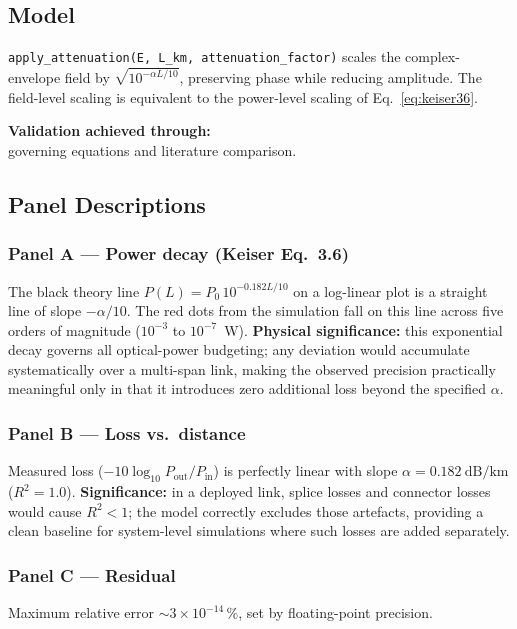 ﻿\documentclass[11pt,a4paper]{article}
\newcommand{\code}[1]{\texttt{#1}}
\begin{document}
\subsection{Model}
\code{apply\_attenuation(E, L\_km, attenuation\_factor)} scales the
complex-envelope field by $\sqrt{10^{-\alpha L/10}}$, preserving phase while
reducing amplitude.  The field-level scaling is equivalent to the
power-level scaling of Eq.~\eqref{eq:keiser36}.

\medskip
\noindent\textbf{Validation achieved through:}\\
governing equations and literature comparison.

\subsection{Panel Descriptions}

\subsubsection*{Panel A --- Power decay (Keiser Eq.~3.6)}
The black theory line $P(L) = P_0\,10^{-0.182L/10}$ on a log-linear plot is
a straight line of slope $-\alpha/10$.  The red dots from the simulation
fall on this line across five orders of magnitude ($10^{-3}$ to
$10^{-7}$~W).  \textbf{Physical significance:} this exponential decay
governs all optical-power budgeting; any deviation would accumulate
systematically over a multi-span link, making the observed precision
practically meaningful only in that it introduces zero additional loss
beyond the specified $\alpha$.

\subsubsection*{Panel B --- Loss vs.\ distance}
Measured loss ($-10\log_{10} P_\text{out}/P_\text{in}$) is perfectly linear
with slope $\alpha = \SI{0.182}{\dB\per\kilo\metre}$ ($R^2 = 1.0$).
\textbf{Significance:} in a deployed link, splice losses and connector
losses would cause $R^2 < 1$; the model correctly excludes those artefacts,
providing a clean baseline for system-level simulations where such losses
are added separately.

\subsubsection*{Panel C --- Residual}
Maximum relative error $\sim\!3\times10^{-14}\,\%$, set by floating-point
precision.
\end{document}

